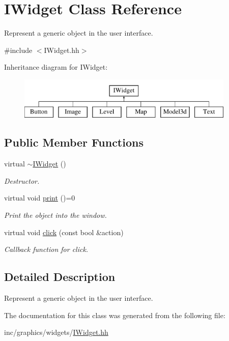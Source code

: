 \hypertarget{classIWidget}{}\section{I\+Widget Class Reference}
\label{classIWidget}


Represent a generic object in the user interface.  




{\ttfamily \#include $<$I\+Widget.\+hh$>$}

Inheritance diagram for I\+Widget\+:\begin{figure}[H]
\begin{center}
\leavevmode
\includegraphics[height=2.000000cm]{classIWidget}
\end{center}
\end{figure}
\subsection*{Public Member Functions}
\begin{DoxyCompactItemize}
\item 
\mbox{\label{classIWidget_ad733ed972c58c5c6268b57e2f4381666}} 
virtual \hyperlink{classIWidget_ad733ed972c58c5c6268b57e2f4381666}{$\sim$\+I\+Widget} ()
\begin{DoxyCompactList}\small\item\em Destructor. \end{DoxyCompactList}\item 
\mbox{\label{classIWidget_ad59738ae1350ed490fdbe07cd1ab4daa}} 
virtual void \hyperlink{classIWidget_ad59738ae1350ed490fdbe07cd1ab4daa}{print} ()=0
\begin{DoxyCompactList}\small\item\em Print the object into the window. \end{DoxyCompactList}\item 
\mbox{\label{classIWidget_aad57c02a26653bff50e9db5910bd6b04}} 
virtual void \hyperlink{classIWidget_aad57c02a26653bff50e9db5910bd6b04}{click} (const bool \&action)
\begin{DoxyCompactList}\small\item\em Callback function for click. \end{DoxyCompactList}\end{DoxyCompactItemize}


\subsection{Detailed Description}
Represent a generic object in the user interface. 

The documentation for this class was generated from the following file\+:\begin{DoxyCompactItemize}
\item 
inc/graphics/widgets/\hyperlink{IWidget_8hh}{I\+Widget.\+hh}\end{DoxyCompactItemize}
